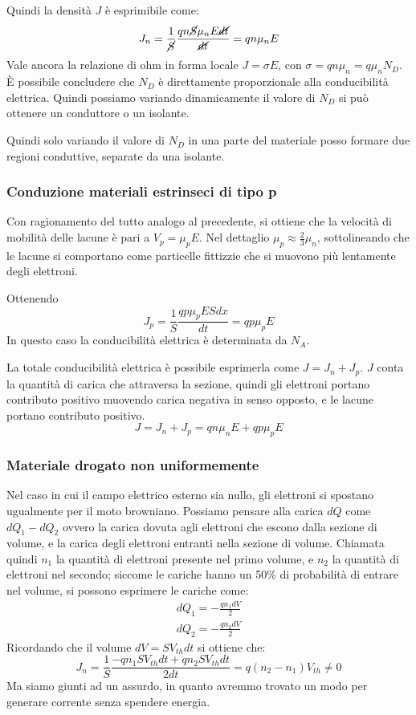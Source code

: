 \documentclass[../template]{subfiles}
\begin{document}
Quindi la densità $J$ è esprimibile come:
\[
    J_n = \frac{1}{\cancel{S}} \frac{qn\cancel{S} \mu_n E \cancel{dt}}{\cancel{dt}} = qn\mu_n E
\]
Vale ancora la relazione di ohm in forma locale $J = \sigma E$, con $\sigma = qn \mu_n = q \mu_n N_D$.
È possibile concludere che $N_D$ è direttamente proporzionale alla conducibilità elettrica. Quindi possiamo variando dinamicamente il valore di $N_D$ si può ottenere un conduttore o un isolante.

Quindi solo variando il valore di $N_D$ in una parte del materiale posso formare due regioni conduttive, separate da una isolante.

\subsubsection{Conduzione materiali estrinseci di tipo p}
Con ragionamento del tutto analogo al precedente, si ottiene che la velocità di mobilità delle lacune è pari a $V_p = \mu_p E$.
Nel dettaglio $\mu_p \approx \frac{2}{3} \mu_n$, sottolineando che le lacune si comportano come particelle fittizzie che si muovono più lentamente degli elettroni.

Ottenendo
\[
    J_p = \frac{1}{S}\frac{qp\mu_pESdx}{dt} = qp\mu_p E
\]
In questo caso la conducibilità elettrica è determinata da $N_A$.

La totale conducibilità elettrica è possibile esprimerla come $J = J_n + J_p$. $J$ conta la quantità di carica che attraversa la sezione, quindi gli elettroni portano contributo positivo muovendo carica negativa in senso opposto, e le lacune portano contributo positivo.
\[
    J = J_n + J_p = qn\mu_n E + qp \mu_p E
\]
\subsubsection{Materiale drogato non uniformemente}

Nel caso in cui il campo elettrico esterno sia nullo, gli elettroni si spostano ugualmente per il moto browniano.
Possiamo pensare alla carica $dQ$ come $dQ_1 - dQ_2$ ovvero la carica dovuta agli elettroni che escono dalla sezione di volume, e la carica degli elettroni entranti nella sezione di volume.
Chiamata quindi $n_1$ la quantità di elettroni presente nel primo volume, e $n_2$ la quantità di elettroni nel secondo; siccome le cariche hanno un 50\% di probabilità di entrare nel volume, si possono esprimere le cariche come:
\begin{align*}
    dQ_1 = -\frac{q n_1 dV}{2}\\
    dQ_2 = -\frac{q n_2 dV}{2}
\end{align*}
Ricordando che il volume $dV = S V_{th} dt$ si ottiene che:
\[
    J_n = \frac{1}{S} \frac{-qn_1 S V_{th} dt + qn_2 S V_{th} dt}{2dt}  = q(n_2 - n_1) V_{th} \neq 0
\]
Ma siamo giunti ad un assurdo, in quanto avremmo trovato un modo per generare corrente senza spendere energia.
\end{document}
